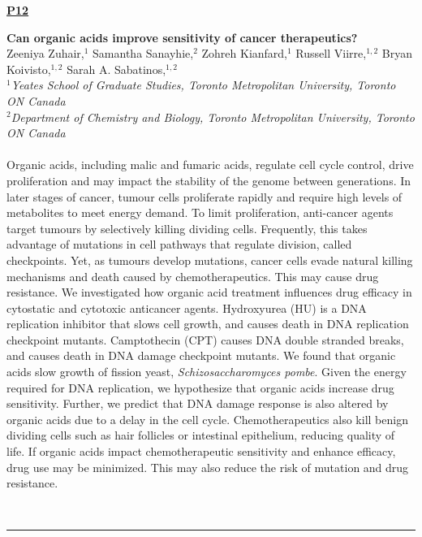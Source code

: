 \documentclass[titlepage,oneside,openany,10pt]{book}
\newenvironment{posterabs}[4] %
        {
	\begin{flushright}
                \underline{\textbf{#4}}
        \end{flushright}
        \textbf{#1}\\%
        #2\\%
        \textit{#3}\\\\%
        }
        {
        \\
        \noindent\rule{15cm}{0.5pt}%
        }
\begin{document}
\newpage

\begin{posterabs}
	{Can organic acids improve sensitivity of cancer therapeutics?}
	{Zeeniya Zuhair,$^{1}$ Samantha Sanayhie,$^{2}$ Zohreh Kianfard,$^{1}$ Russell Viirre,$^{1,2}$ Bryan Koivisto,$^{1,2}$ Sarah A. Sabatinos,$^{1,2}$}
	{
	$^1$Yeates School of Graduate Studies, Toronto Metropolitan University, Toronto ON Canada\\
	$^2$Department of Chemistry and Biology, Toronto Metropolitan University, Toronto ON Canada
	}
	{P12}
	Organic acids, including malic and fumaric acids, regulate cell cycle control, drive proliferation and may impact the stability of the genome between generations. In later stages of cancer, tumour cells proliferate rapidly and require high levels of metabolites to meet energy demand. To limit proliferation, anti-cancer agents target tumours by selectively killing dividing cells. Frequently, this takes advantage of mutations in cell pathways that regulate division, called checkpoints. Yet, as tumours develop mutations, cancer cells evade natural killing mechanisms and death caused by chemotherapeutics. This may cause drug resistance. We investigated how organic acid treatment influences drug efficacy in cytostatic and cytotoxic anticancer agents. Hydroxyurea (HU) is a DNA replication inhibitor that slows cell growth, and causes death in DNA replication checkpoint mutants. Camptothecin (CPT) causes DNA double stranded breaks, and causes death in DNA damage checkpoint mutants. We found that organic acids slow growth of fission yeast, \emph{Schizosaccharomyces pombe}. Given the energy required for DNA replication, we hypothesize that organic acids increase drug sensitivity. Further, we predict that DNA damage response is also altered by organic acids due to a delay in the cell cycle. Chemotherapeutics also kill benign dividing cells such as hair follicles or intestinal epithelium, reducing quality of life. If organic acids impact chemotherapeutic sensitivity and enhance efficacy, drug use may be minimized. This may also reduce the risk of mutation and drug resistance.
	\label{ZuhairZ}
\end{posterabs}
	

\newpage
\end{document}
